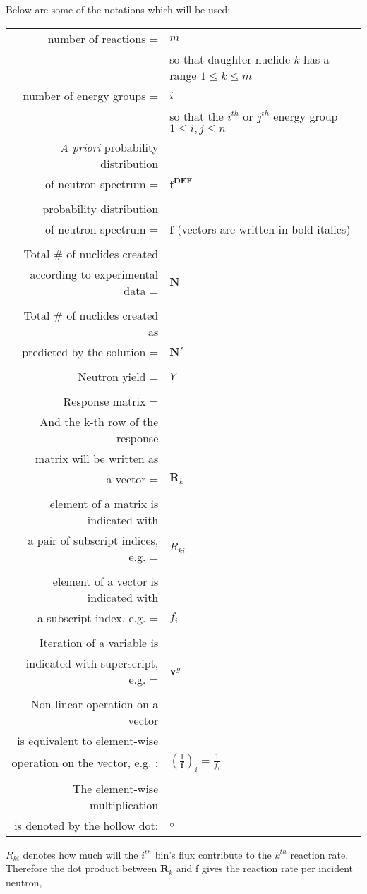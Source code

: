 \documentclass[a4paper, 12pt]{article}
\newcommand{\matr}[1]{\uuline{\bf{#1}}}
\newcommand{\ve}[1]{\boldsymbol{#1}}
\begin{document}
    Below are some of the notations which will be used:
    \begin{table}[H]
    \begin{tabular}{rl}
    number of reactions =& $m$\\
    & so that daughter nuclide $k$ has a range $1\le k\le m$\\
    number of energy groups =& $i$\\
    & so that the $i^{th}$ or $j^{th}$ energy group $1\le i,j\le n$\\
    \emph{A priori} probability distribution \\of neutron spectrum = & $\ve{f^{DEF}}$ \\
    \\
    probability distribution \\
    of neutron spectrum = & $\ve{f}$ (vectors are written in bold italics)\\
    \\
    Total \# of nuclides created\\
    according to experimental data =& $\ve{N}$ \\
    \\
    Total \# of nuclides created as\\
    predicted by the solution =& $\ve{N}'$\\
    \\
    Neutron yield =& $Y$\\
    \\
    Response matrix =& \matr{R} \\
    And the k-th row of the response\\
    matrix will be written as \\
    a vector =& $\ve{R}_k$ \\
    \\
    element of a matrix is indicated with \\
    a pair of subscript indices, e.g. =& $R_{ki}$\\
    \\
    element of a vector is indicated with \\
    a subscript index, e.g. =& $f_{i}$\\
    \\
    Iteration of a variable is\\
    indicated with superscript, e.g. =& $\ve{v}^g$\\
    \\
    Non-linear operation on a vector\\
    is equivalent to element-wise\\
    operation on the vector, e.g. :& $\left(\frac{1}{\ve{f}}\right)_i = \frac{1}{f_i}$\\
    \\
    The element-wise multiplication\\
    is denoted by the hollow dot:   &$\circ$
    \end{tabular}
    \end{table}
    $R_{ki}$ denotes how much will the $i^{th}$ bin's flux contribute to the $k^{th}$ reaction rate. Therefore the dot product between $\ve{R}_k$ and {f} gives the reaction rate per incident neutron,
        
\end{document}
